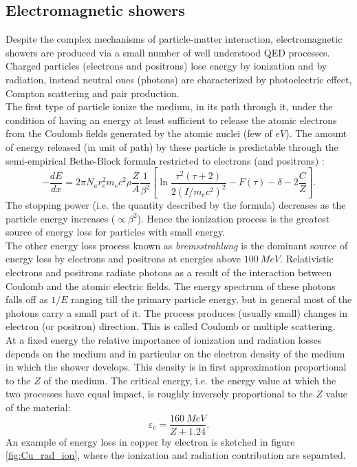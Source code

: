 \subsection{Electromagnetic showers} \label{subsec:em_shower}
Despite the complex mechanisms of particle-matter interaction, electromagnetic showers are produced via a small number of well understood QED processes. Charged particles (electrons and positrons) lose energy by ionization and by radiation, instead neutral ones (photons) are characterized by photoelectric effect, Compton scattering and pair production.\\

The first type of particle ionize the medium, in its path through it, under the condition of having an energy at least sufficient to release the atomic electrons from the Coulomb fields generated by the atomic nuclei (few of $eV$).
The amount of energy released (in unit of path) by these particle is predictable through the semi-empirical Bethe-Block formula restricted to electrons (and positrons) \cite{Leo}:
\begin{equation}
    -\frac{dE}{dx} = 2\pi N_a r_e^2 m_e c^2 \rho \frac{Z}{A}\frac{1}{\beta^2}\left[ \ln{\frac{\tau^2(\tau + 2)}{2(I/m_ec^2)^2}} -F(\tau) -\delta -2\frac{C}{Z}\right].
\end{equation}
The stopping power (i.e. the quantity described by the formula) decreases as the particle energy increases ($\propto \beta^2$). Hence the ionization process is the greatest source of energy loss for particles with small energy.\\
The other energy loss process known as \textit{bremsstrahlung} is the dominant source of energy loss by electrons and positrons at energies above $100\ MeV$. Relativistic electrons and positrons radiate photons as a result of the interaction between Coulomb and the atomic electric fields. The energy spectrum of these photons falls off as $1/E$ ranging till the primary particle energy, but in general most of the photons carry a small part of it.
The process produces (usually small) changes in electron (or positron) direction. This is called Coulomb or multiple scattering.\\
At a fixed energy the relative importance of ionization and radiation losses depends on the medium and in particular on the electron density of the medium in which the shower develops. This density is in first approximation proportional to the $Z$ of the medium.
The critical energy, i.e. the energy value at which the two processes have equal impact, is roughly inversely proportional to the $Z$ value of the material:
\begin{equation}
    \varepsilon_c = \frac{160\ MeV}{Z + 1.24}.
\end{equation}
An example of energy loss in copper by electron is sketched in figure \ref{fig:Cu_rad_ion}, where the ionization and radiation contribution are separated.\\

